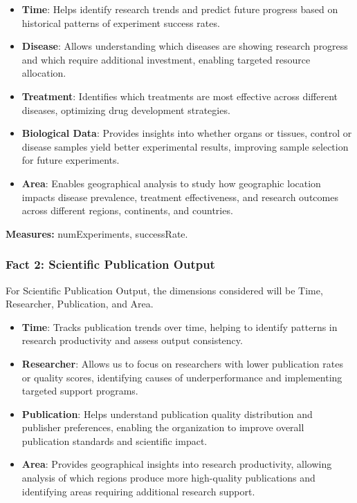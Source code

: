 \documentclass[11pt,a4paper]{article}
\begin{document}
\begin{itemize}
    \item \textbf{Time}: Helps identify research trends and predict future progress based on historical patterns of experiment success rates.
    
    \item \textbf{Disease}: Allows understanding which diseases are showing research progress and which require additional investment, enabling targeted resource allocation.
    
    \item \textbf{Treatment}: Identifies which treatments are most effective across different diseases, optimizing drug development strategies.
    
    \item \textbf{Biological Data}: Provides insights into whether organs or tissues, control or disease samples yield better experimental results, improving sample selection for future experiments.
    
    \item \textbf{Area}: Enables geographical analysis to study how geographic location impacts disease prevalence, treatment effectiveness, and research outcomes across different regions, continents, and countries.
\end{itemize}

\textbf{Measures:} numExperiments, successRate.

\subsubsection{Fact 2: Scientific Publication Output}

For Scientific Publication Output, the dimensions considered will be Time, Researcher, Publication, and Area.

\begin{itemize}
    \item \textbf{Time}: Tracks publication trends over time, helping to identify patterns in research productivity and assess output consistency.
    
    \item \textbf{Researcher}: Allows us to focus on researchers with lower publication rates or quality scores, identifying causes of underperformance and implementing targeted support programs.
    
    \item \textbf{Publication}: Helps understand publication quality distribution and publisher preferences, enabling the organization to improve overall publication standards and scientific impact.
    
    \item \textbf{Area}: Provides geographical insights into research productivity, allowing analysis of which regions produce more high-quality publications and identifying areas requiring additional research support.
\end{itemize}
\end{document}
